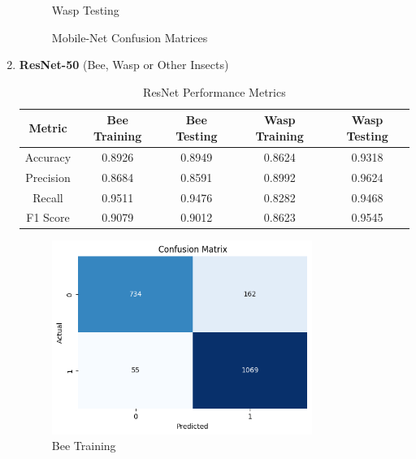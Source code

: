 \documentclass[12pt]{article}
\begin{document}
\begin{enumerate}
\begin{figure}[H]
\begin{minipage}{0.45\textwidth}
				Wasp Testing
			\end{minipage}
			\vspace{1 cm}
			\caption{Mobile-Net Confusion Matrices}
		\end{figure}
		\newpage
		
		\item \textbf{ResNet-50} (Bee, Wasp or Other Insects) \\
		\begin{table}[H]
			\centering
			\caption{ResNet Performance Metrics}
			\vspace{0.25 cm}
			\begin{tabular}{|c|c|c|c|c|}
				\hline
				\textbf{Metric} & \textbf{Bee Training} & \textbf{Bee Testing}  & \textbf{Wasp Training} & \textbf{Wasp Testing}\\
				\hline
				Accuracy & 0.8926  & 0.8949  & 0.8624  & 0.9318  \\ \hline
				Precision & 0.8684 & 0.8591  & 0.8992 & 0.9624  \\ \hline
				Recall & 0.9511 & 0.9476 & 0.8282 & 0.9468 \\ \hline
				F1 Score & 0.9079  & 0.9012 & 0.8623  & 0.9545 \\ \hline
			\end{tabular}
			\label{tab:RESNET_METRICS}
		\end{table}
		\begin{figure}[H]
			\vspace{0.5 cm}
			\centering
			\begin{minipage}{0.45\textwidth}
				\centering
				\includegraphics[width=0.8\textwidth]{Images/Confusion/res bees train.png} \\ \vspace{0.25 cm}
				Bee Training
			\end{minipage}

\end{figure}
\end{enumerate}
\end{document}
